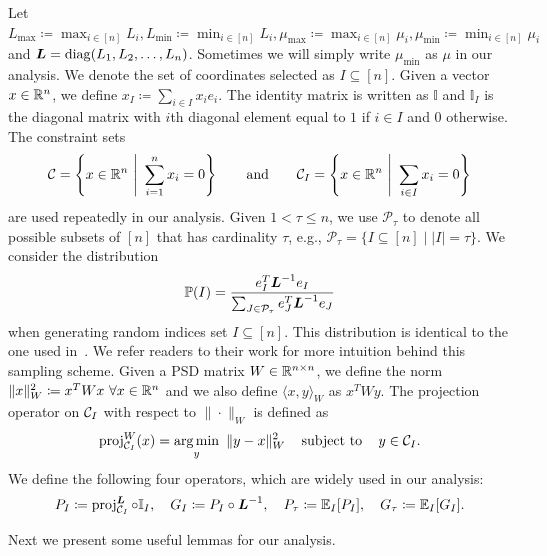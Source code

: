 Let $L_{\max} \coloneqq \max_{i \in [n]} L_i, L_{\min} \coloneqq \min_{i \in [n]} L_i, \mu_{\max} \coloneqq \max_{i \in [n]} \mu_i, \mu_{\min} \coloneqq \min_{i \in [n]} \mu_i$ and $\boldsymbol{L} = \operatorname{diag}(L_1, L_2, \ldots, L_n)$. Sometimes we will simply write $\mu_{\min}$ as $\mu$ in our analysis. 
We denote the set of coordinates selected as $I \subseteq [n]$. Given a vector $x \in \mathbb{R}^n$, we define $x_I \coloneqq \sum_{i \in I} x_i e_i $. The identity matrix is written as $\mathbb{I}$ and $\mathbb{I}_I$ is the diagonal matrix with $i$th diagonal element equal to $1$ if $i \in I$ and $0$ otherwise. The constraint sets
\[
    \mathcal{C} = \left\{x\in\mathbb{R}^n ~\Bigg|~ \sum_{i=1}^n x_i=0\right\} \quad \hbox{\quad and\quad} \quad \mathcal{C}_I=\left\{x\in\mathbb{R}^n ~\Bigg|~ \sum_{i\in I}x_i = 0\right\}
\]
are used repeatedly in our analysis. Given $1 < \tau \leq n$, we use $\mathcal{P}_\tau$ to denote all possible subsets of $[n]$ that has cardinality $\tau$, e.g., $\mathcal{P}_\tau = \{ I \subseteq [n] \mid |I| = \tau \}$. We consider the distribution
\[
    \mathbb{P}(I) = \frac{e_I^T\boldsymbol{L}^{-1}e_I}{\sum_{J \in \mathcal{P}_\tau} e_J^T\boldsymbol{L}^{-1}e_J}
\]
when generating random indices set $I \subseteq [n]$. This distribution is identical to the one used in~\citet{necoara2017random}. We refer readers to their work for more intuition behind this sampling scheme. Given a PSD matrix $W\in \mathbb{R}^{n \times n}$, we define the norm $\|x\|_W^2 \coloneqq x^T W x~\forall x \in \mathbb{R}^{n}$ and we also define $\langle x,y \rangle_{W}$ as $x^T W y$. The projection operator on $\mathcal{C}_I$ with respect to $\|\cdot\|_W$ is defined as
\[
    \operatorname{proj}_{\mathcal{C}_I}^{W}(x) = \underset{y}{\textrm{arg}\,{\min}}\enskip \|y-x\|_W^2 \enspace\enspace\mathop{\hbox{\rm subject to}}\enspace\enspace y \in \mathcal{C}_I.
\]
We define the following four operators, which are widely used in our analysis:
\[
    P_I \coloneqq \operatorname{proj}_{\mathcal{C}_I}^{\boldsymbol{L}} \circ \mathbb{I}_I, \quad  G_I \coloneqq P_I \circ \boldsymbol{L}^{-1}, \quad P_\tau \coloneqq \mathbb{E}_I [P_I], \quad G_\tau \coloneqq \mathbb{E}_I [G_I].
\]

Next we present some useful lemmas for our analysis.

